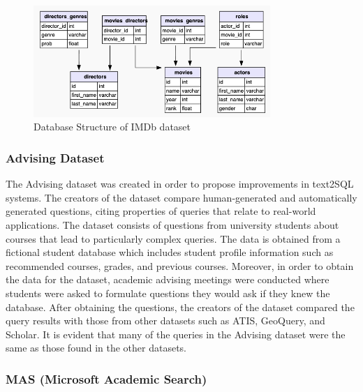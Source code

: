 \begin{figure}[htb]
    \centering
    \includegraphics[width=0.8\textwidth]{pics/db/IMDb.png}
    \caption{Database Structure of IMDb dataset}
    \label{fig:IMDb}
\end{figure}


\subsubsection{Advising Dataset}

The Advising dataset\cite{finegan-dollak-etal-2018-improving} was created in order to propose improvements in text2SQL systems. The creators of the dataset compare human-generated and automatically generated questions, citing properties of queries that relate to real-world applications. The dataset consists of questions from university students about courses that lead to particularly complex queries. The data is obtained from a fictional student database which includes student profile information such as recommended courses, grades, and previous courses. Moreover, in order to obtain the data for the dataset, academic advising meetings were conducted where students were asked to formulate questions they would ask if they knew the database. After obtaining the questions, the creators of the dataset compared the query results with those from other datasets such as ATIS, GeoQuery, and Scholar. It is evident that many of the queries in the Advising dataset were the same as those found in the other datasets.


\subsubsection{MAS (Microsoft Academic Search)}

